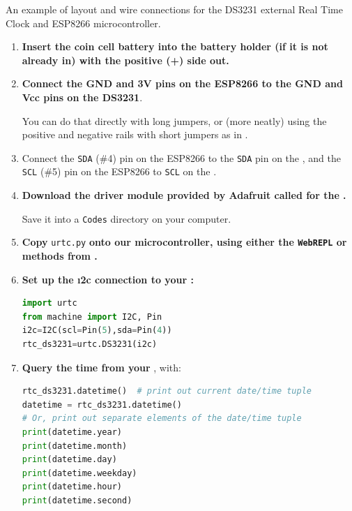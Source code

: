\begin{marginfigure}
\begin{center}
		\caption[DS3231 on breadboard]{An example of layout and wire connections for the DS3231 external Real Time Clock and ESP8266 microcontroller.}
	\end{center}
\end{marginfigure}
\begin{enumerate}
	\item \textbf{Insert the coin cell battery into the battery holder (if it is not already in) with the positive (+) side out.}
	\item \textbf{Connect the GND and 3V pins on the ESP8266 to the GND and Vcc pins on the DS3231}. 
	
	You can do that directly with long jumpers, or (more neatly) using the positive and negative rails with short jumpers as in .
	\item Connect the \texttt{SDA} (\#4) pin on the ESP8266 to the \texttt{SDA} pin on the , and the  \texttt{SCL} (\#5) pin on the ESP8266 to \texttt{SCL} on the .
	\item \textbf{Download the driver module provided by Adafruit called  for the  \rtc.}
	
	Save it into a \texttt{Codes} directory on your computer.
	
	\item \textbf{Copy } \lstinline{urtc.py} \textbf{onto our microcontroller, using either the \texttt{WebREPL} or \mpfshell methods from .}  
	\item %
	\textbf{Set up the \i2c connection to your :}
\begin{lstlisting}[language=Python]
import urtc
from machine import I2C, Pin
i2c=I2C(scl=Pin(5),sda=Pin(4))
rtc_ds3231=urtc.DS3231(i2c)
\end{lstlisting}
	\item \textbf{Query the time from your }, with:
\begin{lstlisting}[language=Python]
rtc_ds3231.datetime()  # print out current date/time tuple
datetime = rtc_ds3231.datetime()
# Or, print out separate elements of the date/time tuple
print(datetime.year)
print(datetime.month)
print(datetime.day)
print(datetime.weekday)
print(datetime.hour)
print(datetime.second)
\end{lstlisting}
\end{enumerate}

